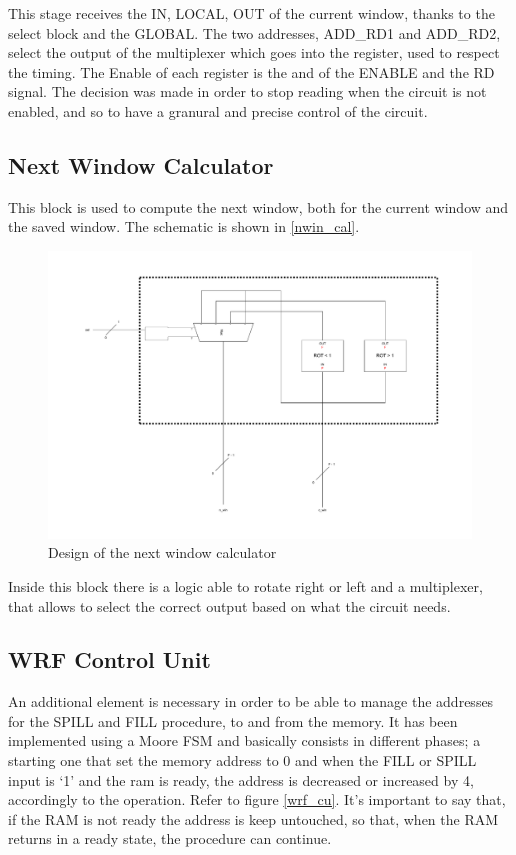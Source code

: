 This stage receives the IN, LOCAL, OUT of the current window, thanks to the select block and the GLOBAL. The two addresses, ADD\_RD1 and ADD\_RD2, select the output of the multiplexer which goes into the register, used to respect the timing. The Enable of each register is the and of the ENABLE and the RD signal. The decision was made in order to stop reading when the circuit is not enabled, and so to have a granural and precise control of the circuit.

\subsection{Next Window Calculator}

This block is used to compute the next window, both for the current window and the saved window. The schematic is shown in \autoref{nwin_cal}.

\begin{figure}[H]
  \centering
  \includegraphics[width=1\textwidth]{chapters/4_DecodeStage/images/nwin_cal.pdf}
  \caption{Design of the next window calculator}
  \label{nwin_cal}
\end{figure}

Inside this block there is a logic able to rotate right or left and a multiplexer, that allows to select the correct output based on what the circuit needs. 

\subsection{WRF Control Unit}

An additional element is necessary in order to be able to manage the addresses for the SPILL and FILL procedure, to and from the memory. It has been implemented using a Moore FSM and basically consists in different phases; a starting one that set the memory address to 0 and when the FILL or SPILL input is `1' and the ram is ready, the address is decreased or increased by 4, accordingly to the operation. Refer to figure \ref{wrf_cu}. It's important to say that, if the RAM is not ready the address is keep untouched, so that, when the RAM returns in a ready state, the procedure can continue.


